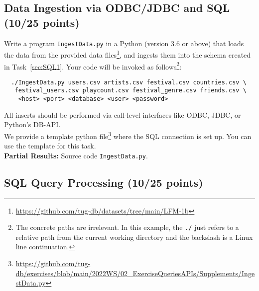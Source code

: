 \documentclass[
        a4paper,
        pdftex,
        english, 
        oneside,%
        listof=totoc,%
        bibliography=totoc, %
        titlepage,
        abstracton 
]{scrartcl} %
\begin{document}
\subsection{Data Ingestion via ODBC/JDBC and SQL (10/25 points)}
\label{sec:API}

Write a program \texttt{IngestData.py} in a Python (version 3.6 or above) that loads the data from the provided data files\footnote{\url{https://github.com/tug-db/datasets/tree/main/LFM-1b}}, and ingests them into the schema created in Task~\ref{sec:SQL1}. Your code will be invoked as follows\footnote{ The concrete paths are irrelevant. In this example, the \texttt{./} just refers to a relative path from the current working directory and the backslash is a Linux line continuation.}: 
\begin{verbatim}
  ./IngestData.py users.csv artists.csv festival.csv countries.csv \
   festival_users.csv playcount.csv festival_genre.csv friends.csv \
    <host> <port> <database> <user> <password>
\end{verbatim}

\noindent All inserts should be performed via call-level interfaces like ODBC, JDBC, or Python's DB-API.\\
\noindent We provide a template python file\footnote{\url{https://github.com/tug-db/exercises/blob/main/2022WS/02_ExerciseQueriesAPIs/Supplements/IngestData.py}} where the SQL connection is set up. You can use the template for this task.\\

\textbf{Partial Results:} Source code \texttt{IngestData.py}.


\subsection{SQL Query Processing (10/25 points)}
\label{sec:SQL2}
\end{document}
